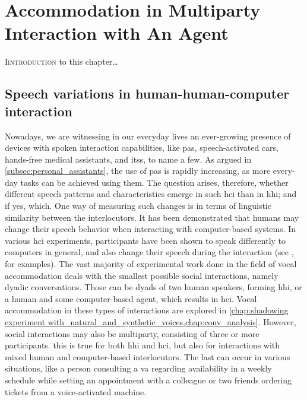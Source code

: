 \chapter{Accommodation in Multiparty Interaction with An Agent}
\label{chap:speech_variations_in_hhci}

\lettrine{I}{introduction} to this chapter\ldots

\pagebreak

\section{Speech variations in human-human-computer interaction}
\label{sec:accommodation_in_multiparty_interaction_with_an_agent}

Nowadays, we are witnessing in our everyday lives an ever-growing presence of devices with spoken interaction capabilities, like \acp{pa}, speech-activated cars, hands-free medical assistants, and \acp{its}, to name a few.
As argued in \cref{subsec:personal_assistants}, the use of \acp{pa} is rapidly increasing, as more every-day tasks can be achieved using them.
The question arises, therefore, whether different speech patterns and characteristics emerge in such \ac{hci} than in \ac{hhi}; and if yes, which.
One way of measuring such changes is in terms of linguistic similarity between the interlocutors.
It has been demonstrated that humans may change their speech behavior when interacting with computer-based systems.
In various \ac{hci} experiments, participants have been shown to speak differently to computers in general, and also change their speech during the interaction (see \citet{Branigan2010linguistic}, for examples).
The vast majority of experimental work done in the field of vocal accommodation deals with the smallest possible social interactions, namely dyadic conversations.
Those can be dyads of two human speakers, forming \ac{hhi}, or a human and some computer-based agent, which results in \ac{hci}.
Vocal accommodation in these types of interactions are explored in \cref{chap:shadowing experiment with_natural_and_synthetic_voices,chap:conv_analysis}.
However, social interactions may also be multiparty, consisting of three or more participants.
this is true for both \ac{hhi} and \ac{hci}, but also for interactions with mixed human and computer-based interlocutors.
The last can occur in various situations, like a person consulting a \ac{va} regarding availability in a weekly schedule while setting an appointment with a colleague or two friends ordering tickets from a voice-activated machine.
